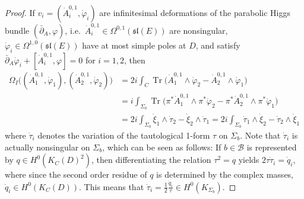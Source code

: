 \documentclass[12pt,letterpaper,reqno]{amsart}
\theoremstyle{remark}
\theoremstyle{definition}
\numberwithin{thm}{section}
\numberwithin{equation}{section}
\numberwithin{figure}{section}
\DeclareMathOperator{\Tr}{Tr}
\begin{document}
\begin{proof}
 If $v_i = (\dot A^{0,1}_i, \dot \varphi_i)$ are infinitesimal deformations of the parabolic Higgs bundle $(\bar\partial_A,\varphi)$, i.e.\ $\dot A^{0,1}_i \in \Omega^{0,1}(\mathfrak{sl}(E))$ are nonsingular, $\dot\varphi_i \in \Omega^{1,0}(\mathfrak{sl}(E))$ have at most simple poles at $D$, and satisfy $\bar\partial_A \dot\varphi_i + [\dot{A}^{0,1}_i,\varphi]=0$ for $i=1,2$, then 
\begin{align*}
\Omega_I \bigl( (\dot{A}^{0,1}_1, \dot\varphi_1), (\dot{A}^{0,1}_2, \dot\varphi_2) \bigr) &= 2i \int_C \Tr \bigl(\dot{A}^{0,1}_1 \wedge \dot \varphi_2 - \dot{A}^{0,1}_2 \wedge \dot \varphi_1 \bigr) \\
&= i \int_{\Sigma_b} \Tr \bigl(\pi^*\dot{A}^{0,1}_1 \wedge \pi^*\dot \varphi_2 - \pi^*\dot{A}^{0,1}_2 \wedge \pi^*\dot \varphi_1 \bigr)   \\
&= 2i \int_{\Sigma_b} \dot\xi_1 \wedge \dot \tau_2 - \dot\xi_2 \wedge \dot \tau_1 = 2i \int_{\Sigma_b} \dot \tau_1\wedge  \dot\xi_2 -  \dot \tau_2 \wedge \dot\xi_1
\end{align*}
where $\dot\tau_i$ denotes the variation of the tautological 1-form $\tau$ on $\Sigma_b$. Note that $\dot\tau_i$ is actually nonsingular on $\Sigma_b$, which can be seen as follows: If $b \in \mathcal{B}$ is represented by $q \in H^0(K_C(D)^2)$, then differentiating the relation $\tau^2 = q$ yields $2 \tau \dot\tau_i = \dot q_i$, where since the second order residue of $q$ is determined by the complex masses, $\dot q_i \in H^0(K_C(D))$. This means that $\dot\tau_i = \frac 12 \frac{\dot q_i}{\tau} \in H^0(K_{\Sigma_b})$.






\end{proof}
\end{document}
